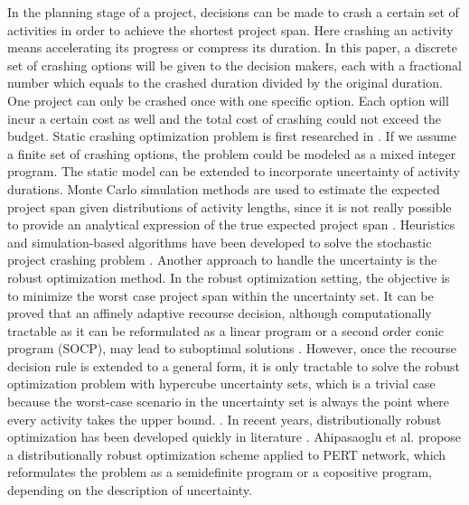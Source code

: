 \documentclass[11pt]{article}
\begin{document}
	In the planning stage of a project, decisions can be made to crash a certain set of activities in order to achieve the shortest project span. Here crashing an activity means accelerating its progress or compress its duration. In this paper, a discrete set of crashing options will be given to the decision makers, each with a fractional number which equals to the crashed duration divided by the original duration. One project can only be crashed once with one specific option. Each option will incur a certain cost as well and the total cost of crashing could not exceed the budget. Static crashing optimization problem is first researched in \cite{fulkerson1961network, kelley1961criticalpath}. If we assume a finite set of crashing options, the problem could be modeled as a mixed integer program. The static model can be extended to incorporate uncertainty of activity durations. Monte Carlo simulation methods are used to estimate the expected project span given distributions of activity lengths, since it is not really possible to provide an analytical expression of the true expected project span \cite{burt1971conditional,van1963letter}. Heuristics and simulation-based algorithms have been developed to solve the stochastic project crashing problem \cite{aghaie2009ant,bowman1994stochastic,ke2014genetic,kim2007heuristic}. Another approach to handle the uncertainty is the robust optimization method. In the robust optimization setting, the objective is to minimize the worst case project span within the uncertainty set. It can be proved that an affinely adaptive recourse decision, although computationally tractable as it can be reformulated as a linear program or a second order conic program (SOCP), may lead to suboptimal solutions \cite{chen2008linear,cohen2007stochastic}. However, once the recourse decision rule is extended to a general form, it is only tractable to solve the robust optimization problem with hypercube uncertainty sets, which is a trivial case because the worst-case scenario in the uncertainty set is always the point where every activity takes the upper bound. \cite{wiesemann2012robust}. In recent years, distributionally robust optimization has been developed quickly in literature \cite{delage2010distributionally}. Ahipasaoglu et al. \cite{ahipasaoglu2016distributionally} propose a distributionally robust optimization scheme applied to PERT network, which reformulates the problem as a semidefinite program or a copositive program, depending on the description of uncertainty.\\
	\newline
\end{document}
